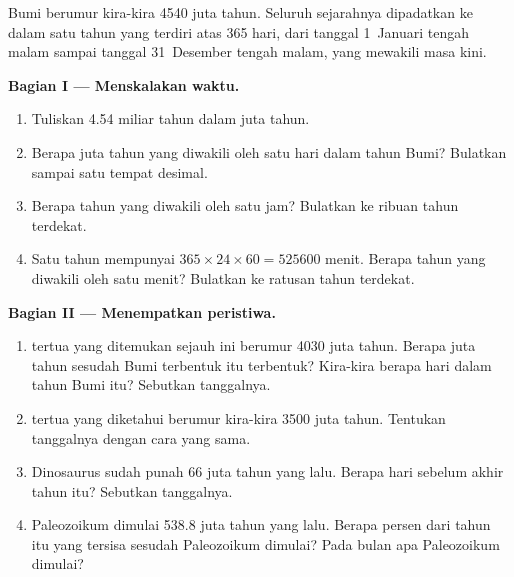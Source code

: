 \begin{problem}
\label{pb:g7:geological-time:1}
Bumi berumur kira-kira \num{4540} juta tahun. Seluruh sejarahnya
dipadatkan ke dalam satu tahun yang terdiri atas 365 hari, dari tanggal
1~Januari tengah malam sampai tanggal 31~Desember tengah malam, yang
mewakili masa kini.

\medskip
\noindent\textbf{Bagian I --- Menskalakan waktu.}\par\nopagebreak
\begin{enumerate}[beginpenalty=10000]
  \item Tuliskan \num{4.54} miliar tahun dalam juta tahun.
  \item Berapa juta tahun yang diwakili oleh satu hari dalam tahun Bumi?
        Bulatkan sampai satu tempat desimal.
  \item Berapa tahun yang diwakili oleh satu jam? Bulatkan ke ribuan tahun
        terdekat.
  \item Satu tahun mempunyai $365 \times 24 \times 60 = \num{525600}$ menit.
        Berapa tahun yang diwakili oleh satu menit? Bulatkan ke ratusan
        tahun terdekat.
\end{enumerate}

\medskip
\noindent\textbf{Bagian II --- Menempatkan peristiwa.}\par\nopagebreak
\begin{enumerate}[resume, beginpenalty=10000]
  \item {} tertua yang ditemukan sejauh ini berumur \num{4030} juta
        tahun. Berapa juta tahun sesudah Bumi terbentuk  itu
        terbentuk? Kira-kira berapa hari dalam tahun Bumi itu? Sebutkan
        tanggalnya.
  \item {} tertua yang diketahui berumur kira-kira \num{3500} juta
        tahun. Tentukan tanggalnya dengan cara yang sama.
  \item Dinosaurus sudah punah \num{66} juta tahun yang lalu. Berapa hari
        sebelum akhir tahun itu? Sebutkan tanggalnya.
  \item Paleozoikum dimulai \num{538.8} juta tahun yang lalu. Berapa persen
        dari tahun itu yang tersisa sesudah Paleozoikum dimulai? Pada bulan
        apa Paleozoikum dimulai?
\end{enumerate}


\end{problem}
